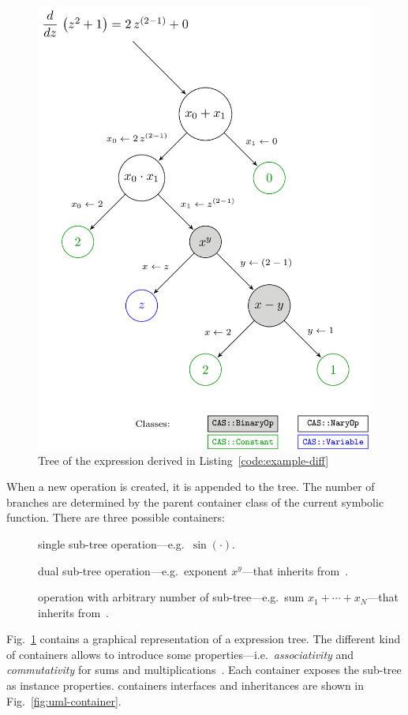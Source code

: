 \begin{figure}[ht!]
\centering
%
\includegraphics{img/graph-ex.png}
\caption{\label{fig:graph}Tree of the expression derived in Listing~\ref{code:example-diff}}
\end{figure}

When a new operation is created, it is appended to the tree. The number of branches are determined by the parent container class of the current symbolic function. There are three possible containers:
\begin{description}
  \item[\CASOp] single sub-tree operation---e.g.~$\sin(\cdot)$.
  \item[\CASBinaryOp] dual sub-tree operation---e.g.~exponent $x^y$---that inherits from~\CASOp.
  \item[\CASNaryOp] operation with arbitrary number of sub-tree---e.g.~sum $x_1 + \cdots + x_N$---that inherits from~\CASOp.
\end{description}
Fig.~\ref{fig:graph} contains a graphical representation of a expression tree. The different kind of containers allows to introduce some properties---i.e.~\emph{associativity} and \emph{commutativity} for sums and multiplications~\cite{cohen2003computer}. Each container exposes the sub-tree as instance properties.  containers interfaces and inheritances are shown in Fig.~\ref{fig:uml-container}. 

